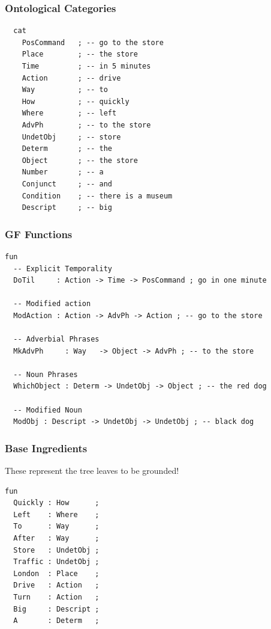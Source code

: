 \documentclass{beamer}
\begin{document}
\begin{frame}[fragile]
\frametitle{Ontological Categories}
\begin{verbatim}
  cat
    PosCommand   ; -- go to the store
    Place        ; -- the store
    Time         ; -- in 5 minutes
    Action       ; -- drive
    Way          ; -- to
    How          ; -- quickly
    Where        ; -- left
    AdvPh        ; -- to the store
    UndetObj     ; -- store
    Determ       ; -- the
    Object       ; -- the store
    Number       ; -- a
    Conjunct     ; -- and
    Condition    ; -- there is a museum
    Descript     ; -- big
\end{verbatim}
\end{frame}

\begin{frame}[fragile]
\frametitle{GF Functions}
\begin{verbatim}
fun
  -- Explicit Temporality
  DoTil     : Action -> Time -> PosCommand ; go in one minute

  -- Modified action
  ModAction : Action -> AdvPh -> Action ; -- go to the store

  -- Adverbial Phrases
  MkAdvPh     : Way   -> Object -> AdvPh ; -- to the store

  -- Noun Phrases
  WhichObject : Determ -> UndetObj -> Object ; -- the red dog

  -- Modified Noun
  ModObj : Descript -> UndetObj -> UndetObj ; -- black dog
\end{verbatim}
\end{frame}

\begin{frame}[fragile]
\frametitle{Base Ingredients}

These represent the tree leaves to be grounded!

\begin{verbatim}
fun
  Quickly : How      ;
  Left    : Where    ;
  To      : Way      ;
  After   : Way      ;
  Store   : UndetObj ;
  Traffic : UndetObj ;
  London  : Place    ;
  Drive   : Action   ;
  Turn    : Action   ;
  Big     : Descript ;
  A       : Determ   ;
\end{verbatim}
\end{frame}
\end{document}
